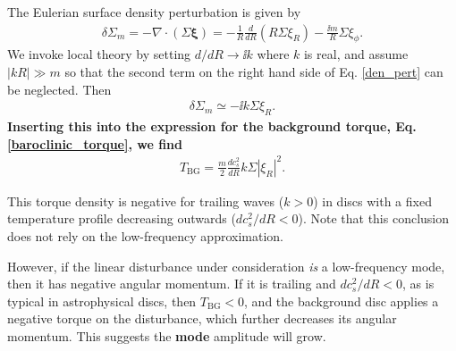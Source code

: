 The Eulerian surface density perturbation is given by
\begin{align}\label{den_pert}
  \delta\Sigma_m = -\nabla\cdot\left(\Sigma\bm{\xi}\right) 
  = -\frac{1}{R}\frac{d}{dR}\left(R\Sigma \xi_R\right) - \frac{\ii m}{R}\Sigma\xi_\phi.  
\end{align}
We invoke local theory by setting $d/dR \to \ii k$ where $k$ is
real, and assume $|kR|\gg m$ so that the second term on the right hand
side of Eq. \ref{den_pert} can be neglected. Then    
\begin{align}
  \delta\Sigma _m  \simeq -\ii k \Sigma \xi_R.
\end{align}
{\bf Inserting this into the expression for the background torque,
  Eq. \ref{baroclinic_torque}, we find}
\begin{align}
  T_\mathrm{BG} = \frac{m}{2}\frac{dc_s^2}{dR}k\Sigma |\xi_R|^2. \label{baroclinic_torque1}
\end{align}


This torque density is negative for trailing waves ($k>0$) in discs with
a fixed temperature profile decreasing outwards ($dc_s^2/dR<0$). Note
that this conclusion does not rely on the low-frequency approximation.    

However, if the linear disturbance under consideration \emph{is} a
low-frequency mode, then it has negative angular
momentum. If it is trailing and $dc_s^2/dR<0$, as is typical
in astrophysical discs, then $T_\mathrm{BG}<0$, and
the background disc applies a negative torque on the disturbance,
which further decreases its angular momentum. This suggests the {\bf
  mode} 
amplitude will grow.  

